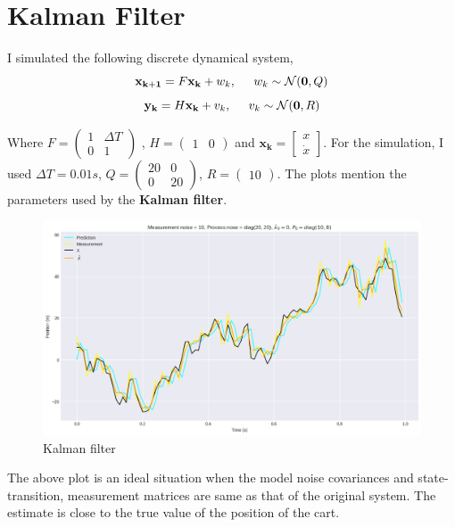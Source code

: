 \documentclass[11pt]{article}
\begin{document}
\section{Kalman Filter}
I simulated the following discrete dynamical system, 
    $$ \mathbf{x_{k+1}} = F \mathbf{x_k} + w_k, \hspace*{5mm} w_k \sim \mathcal{N}(\mathbf{0}, Q)$$
    $$\mathbf{y_k} = H \mathbf{x_k} + v_k, \hspace*{5mm} v_k \sim \mathcal{N}(\mathbf{0}, R)$$

Where $F = \begin{pmatrix}
    1 & \Delta T \\ 0 & 1    
\end{pmatrix}$ , $H = \begin{pmatrix}
    1 & 0
 \end{pmatrix}$
 and $\mathbf{x_k} = \begin{bmatrix}
    x \\ \dot{x}
 \end{bmatrix}$. For the simulation, I used $\Delta T = 0.01s$, $Q = \begin{pmatrix}
    20 & 0 \\ 0 & 20
 \end{pmatrix}$, $R = \begin{pmatrix}
    10
 \end{pmatrix}$. The plots mention the parameters used by the \textbf{Kalman filter}. 

 \begin{figure}[H]
    \centering
    \includegraphics[width=\linewidth]{../kfnormal.png}
    \caption*{Kalman filter}
\end{figure}
The above plot is an ideal situation when the model noise covariances and state-transition, measurement matrices are same as that
of the original system. The estimate is close to the true value of the position of the cart.
\end{document}
